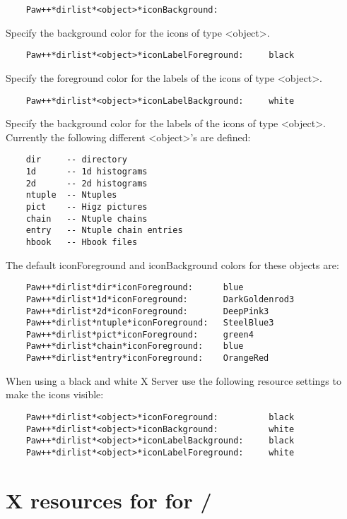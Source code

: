 \begin{verbatim}
    Paw++*dirlist*<object>*iconBackground:
\end{verbatim}

   Specify the background color for the icons of type <object>.

\begin{verbatim}
    Paw++*dirlist*<object>*iconLabelForeground:     black
\end{verbatim}

   Specify the foreground color for the labels of the icons of type <object>.

\begin{verbatim}
    Paw++*dirlist*<object>*iconLabelBackground:     white
\end{verbatim}

   Specify the background color for the labels of the icons of type <object>.
   Currently the following different <object>'s are defined:

\begin{verbatim}
    dir     -- directory
    1d      -- 1d histograms
    2d      -- 2d histograms
    ntuple  -- Ntuples
    pict    -- Higz pictures
    chain   -- Ntuple chains
    entry   -- Ntuple chain entries
    hbook   -- Hbook files
\end{verbatim}

   The default iconForeground and iconBackground colors for these objects are:

\begin{verbatim}
    Paw++*dirlist*dir*iconForeground:      blue
    Paw++*dirlist*1d*iconForeground:       DarkGoldenrod3
    Paw++*dirlist*2d*iconForeground:       DeepPink3
    Paw++*dirlist*ntuple*iconForeground:   SteelBlue3
    Paw++*dirlist*pict*iconForeground:     green4
    Paw++*dirlist*chain*iconForeground:    blue
    Paw++*dirlist*entry*iconForeground:    OrangeRed
\end{verbatim}

   When using a black and white X Server use the following resource settings
   to make the icons visible:

\begin{verbatim}
    Paw++*dirlist*<object>*iconForeground:          black
    Paw++*dirlist*<object>*iconBackground:          white
    Paw++*dirlist*<object>*iconLabelBackground:     black
    Paw++*dirlist*<object>*iconLabelForeground:     white
\end{verbatim}

\section{X resources for for \KUIP/\MOTIF}

